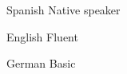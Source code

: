\begin{cvskills}

  \cvskill
    {Spanish} %
    {Native speaker} %

  \cvskill
    {English} %
    {Fluent} %

  \cvskill
    {German} %
    {Basic} %
    
\end{cvskills}
